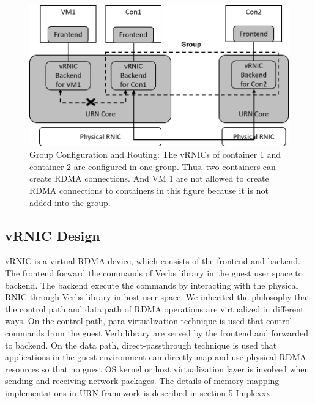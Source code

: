 \begin{figure}[!ht]
	\centering
	\includegraphics[width=1.0\linewidth]{images/route-config}
	\caption{Group Configuration and Routing: The vRNICs of container 1 and container 2 are configured in one group. Thus, two containers can create RDMA connections. And VM 1 are not allowed to create RDMA connections to containers in this figure because it is not added into the group. }
	\label{fig:route-config}
\end{figure}


\subsection{vRNIC Design}
vRNIC is a virtual RDMA device, which consists of the frontend and backend. The frontend forward the commands of Verbs library in the guest user space to backend. The backend execute the commands by interacting with the physical RNIC through Verbs library in host user space. We inherited the philosophy that the control path and data path of RDMA operations are virtualized in different ways\cite{pfefferle2015hybrid}\cite{he2020masq}\cite{kim2019freeflow}. On the control path, para-virtualization technique is used that control commands from the guest Verb library are served by the frontend and forwarded to backend. On the data path, direct-passthrough technique is used that applications in the guest environment can directly map and use physical RDMA resources so that no guest OS kernel or host virtualization layer is involved when sending and receiving network packages. The details of memory mapping implementations in URN framework is described in section 5 Implexxx.

